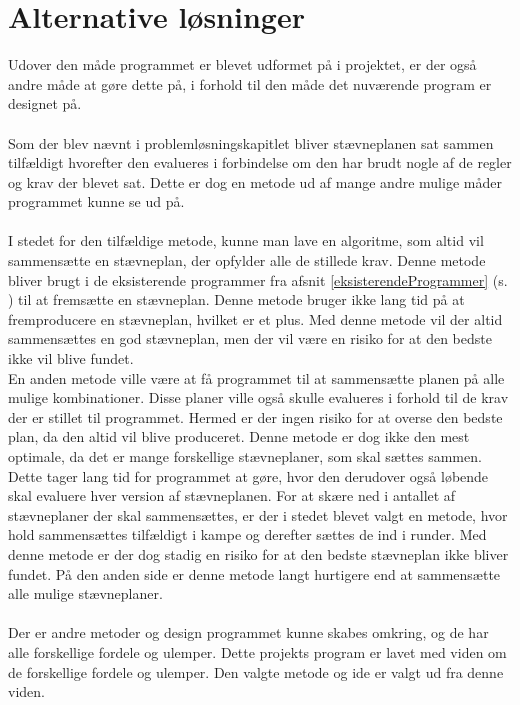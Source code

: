 \section*{Alternative løsninger}
Udover den måde programmet er blevet udformet på i projektet, er der også andre måde at gøre dette på, i forhold til den måde det nuværende program er designet på.
\\\\
Som der blev nævnt i problemløsningskapitlet bliver stævneplanen sat sammen tilfældigt hvorefter den evalueres i forbindelse om den har brudt nogle af de regler og krav der blevet sat. Dette er dog en metode ud af mange andre mulige måder programmet kunne se ud på.
\\\\
I stedet for den tilfældige metode, kunne man lave en algoritme, som altid vil sammensætte en stævneplan, der opfylder alle de stillede krav. Denne metode bliver brugt i de eksisterende programmer fra afsnit \ref{eksisterendeProgrammer} (s. \pageref{eksisterendeProgrammer}) til at fremsætte en stævneplan. Denne metode bruger ikke lang tid på at fremproducere en stævneplan, hvilket er et plus. Med denne metode vil der altid sammensættes en god stævneplan, men der vil være en risiko for at den bedste ikke vil blive fundet.
\\
En anden metode ville være at få programmet til at sammensætte planen på alle mulige kombinationer. Disse planer ville også skulle evalueres i forhold til de krav der er stillet til programmet. Hermed er der ingen risiko for at overse den bedste plan, da den altid vil blive produceret. Denne metode er dog ikke den mest optimale, da det er mange forskellige stævneplaner, som skal sættes sammen.
\\
Dette tager lang tid for programmet at gøre, hvor den derudover også løbende skal evaluere hver version af stævneplanen. For at skære ned i antallet af stævneplaner der skal sammensættes, er der i stedet blevet valgt en metode, hvor hold sammensættes tilfældigt i kampe og derefter sættes de ind i runder. Med denne metode er der dog stadig en risiko for at den bedste stævneplan ikke bliver fundet. På den anden side er denne metode langt hurtigere end at sammensætte alle mulige stævneplaner.
\\\\
Der er andre metoder og design programmet kunne skabes omkring, og de har alle forskellige fordele og ulemper. Dette projekts program er lavet med viden om de forskellige fordele og ulemper. Den valgte metode og ide er valgt ud fra denne viden. 

